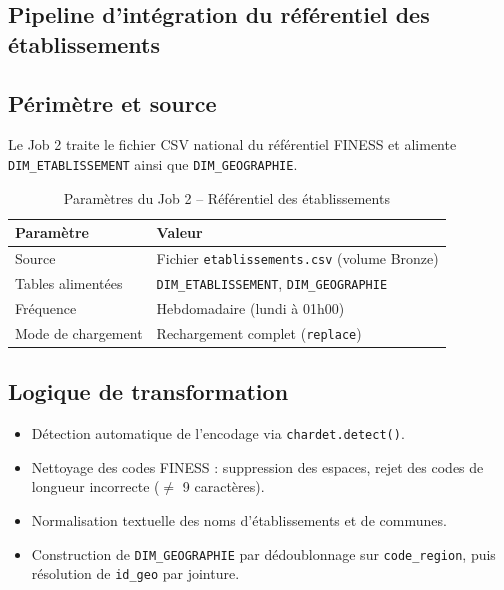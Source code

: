 \documentclass[12pt, a4paper]{report}
\begin{document}
\begin{itemize}[label=\textcolor{chuBlue}{\textbullet}]
\section{Pipeline d'intégration du référentiel des établissements}
\label{sec:job2}

\subsection{Périmètre et source}

Le Job 2 traite le fichier CSV national du référentiel FINESS et alimente \texttt{DIM\_ETABLISSEMENT} ainsi que \texttt{DIM\_GEOGRAPHIE}.

\begin{table}[htbp]
\centering\footnotesize\renewcommand{\arraystretch}{1.4}
\begin{tabularx}{\linewidth}{@{} L{3.5cm} X @{}}
\toprule
{}
\textbf{Paramètre} & \textbf{Valeur} \\
\midrule
Source & Fichier \texttt{etablissements.csv} (volume Bronze) \\
Tables alimentées & \texttt{DIM\_ETABLISSEMENT}, \texttt{DIM\_GEOGRAPHIE} \\
Fréquence & Hebdomadaire (lundi à 01h00) \\
Mode de chargement & Rechargement complet (\texttt{replace}) \\
\bottomrule
\end{tabularx}
\caption{Paramètres du Job 2 -- Référentiel des établissements}
\label{tab:job2_params}
\end{table}

\subsection{Logique de transformation}

\begin{itemize}[label=\textcolor{chuBlue}{\textbullet}]
  \item Détection automatique de l'encodage via \texttt{chardet.detect()}.
  \item Nettoyage des codes FINESS : suppression des espaces, rejet des codes de longueur incorrecte ($\neq$ 9 caractères).
  \item Normalisation textuelle des noms d'établissements et de communes.
  \item Construction de \texttt{DIM\_GEOGRAPHIE} par dédoublonnage sur \texttt{code\_region}, puis résolution de \texttt{id\_geo} par jointure.
\end{itemize}


\end{itemize}
\end{document}
